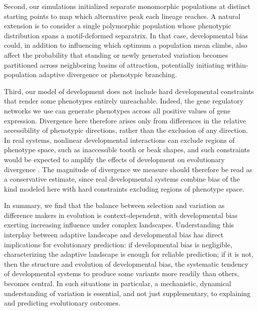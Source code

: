 Second, our simulations initialized separate monomorphic populations at distinct starting points to map which alternative peak each lineage reaches.
A natural extension is to consider a single polymorphic population whose phenotypic distribution spans a motif-deformed separatrix.
In that case, developmental bias could, in addition to influencing which optimum a population mean climbs, also affect the probability that standing or newly generated variation becomes partitioned across neighboring basins of attraction, potentially initiating within-population adaptive divergence or phenotypic branching.

Third, our model of development does not include hard developmental constraints that render some phenotypes entirely unreachable.
Indeed, the gene regulatory networks we use can generate phenotypes across all positive values of gene expression.
Divergence here therefore arises only from differences in the relative accessibility of phenotypic directions, rather than the exclusion of any direction.
In real systems, nonlinear developmental interactions can exclude regions of phenotype space, such as inaccessible tooth \parencite{salazar2010computational} or beak \parencite{al2021geometry} shapes, and such constraints would be expected to amplify the effects of development on evolutionary divergence \parencite{milocco2020evolution, rice2002general, gonzalez2024mathematical}.
The magnitude of divergence we measure should therefore be read as a conservative estimate, since real developmental systems combine bias of the kind modeled here with hard constraints excluding regions of phenotype space.

In summary, we find that the balance between selection and variation as difference makers in evolution is context-dependent, with developmental bias exerting increasing influence under complex landscapes.
Understanding this interplay between adaptive landscape and developmental bias has direct implications for evolutionary prediction: if developmental bias is negligible, characterizing the adaptive landscape is enough for reliable prediction; if it is not, then the structure and evolution of developmental bias, the systematic tendency of developmental systems to produce some variants more readily than others, becomes central.
In such situations in particular, a mechanistic, dynamical understanding of variation is essential, and not just supplementary, to explaining and predicting evolutionary outcomes.

